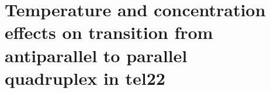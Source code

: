 \section[%
	Temperature and concentration effects on transition from antiparallel	to
	parallel quadruplex in tel22
]{%
	Temperature and concentration effects on transition from antiparallel to
	parallel\\quadruplex in tel22
}
